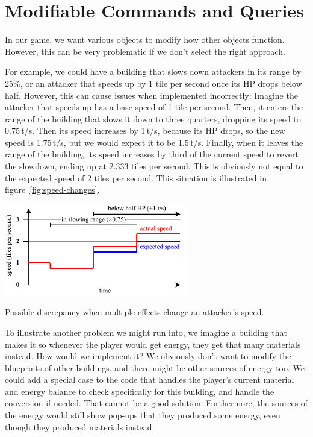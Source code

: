 \section{Modifiable Commands and Queries}\label{sec:analysis-modifiable-commands}

In our game, we want various objects to modify how other objects function.
However, this can be very problematic if we don't select the right approach.

For example, we could have a building that slows down attackers in its range by 25\%, or an attacker that speeds up by 1 tile per second once its HP drops below half.
However, this can cause issues when implemented incorrectly:
Imagine the attacker that speeds up has a base speed of 1 tile per second.
Then, it enters the range of the building that slows it down to three quarters, dropping its speed to 0.75\,t/s.
Then its speed increases by 1\,t/s, because its HP drops, so the new speed is 1.75\,t/s, but we would expect it to be 1.5\,t/s.
Finally, when it leaves the range of the building, its speed increases by third of the current speed to revert the slowdown, ending up at 2.333 tiles per second.
This is obviously not equal to the expected speed of 2 tiles per second.
This situation is illustrated in figure~\ref{fig:speed-changes}.

\begin{center}
    \captionsetup{type=figure}
    \includegraphics[width=0.6\textwidth]{img/speed changes.pdf}
    \caption{Possible discrepancy when multiple effects change an attacker's speed.}
    \label{fig:speed-changes}
\end{center}

To illustrate another problem we might run into, we imagine a building that makes it so whenever the player would get energy, they get that many materials instead.
How would we implement it?
We obviously don't want to modify the blueprints of other buildings, and there might be other sources of energy too.
We could add a special case to the code that handles the player's current material and energy balance to check specifically for this building, and handle the conversion if needed.
That cannot be a good solution.
Furthermore, the sources of the energy would still show pop-ups that they produced some energy, even though they produced materials instead.

